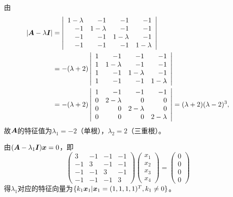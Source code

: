 \begin{frame}\ft{\subsecname}
\begin{jie}
  由
  $$
  \begin{aligned}
  |\boldsymbol{A}-\lambda\boldsymbol{I}|&=
  \left|
    \begin{array}{rrrr}
      1-\lambda&-1&-1&-1\\
      -1&1-\lambda&-1&-1\\
      -1&-1&1-\lambda&-1\\
      -1&-1&-1&1-\lambda
    \end{array}
  \right|\\
  &=-(\lambda+2)
  \left|
    \begin{array}{rrrr}
      1&-1&-1&-1\\
      1&1-\lambda&-1&-1\\
      1&-1&1-\lambda&-1\\
      1&-1&-1&1-\lambda
    \end{array}
  \right|\\
  &=-(\lambda+2)
  \left|
    \begin{array}{rrrr}
      1&-1&-1&-1\\
      0&2-\lambda&0&0\\
      0&0&2-\lambda&0\\
      0&0&0&2-\lambda
    \end{array}
  \right|=(\lambda+2)(\lambda-2)^3,
  \end{aligned}
  $$
  故$\boldsymbol{A}$的特征值为$\lambda_1=-2$（单根），$\lambda_2=2$（三重根）。

  由$(\boldsymbol{A}-\lambda_1\boldsymbol{I}){\boldsymbol{x}}=0$，即
  $$
  \left(
    \begin{array}{rrrr}
      3&-1&-1&-1\\
      -1&3&-1&-1\\
      -1&-1&3&-1\\
      -1&-1&-1&3
    \end{array}
  \right)
  \left(
    \begin{array}{c}
      x_1\\x_2\\x_3\\x_4
    \end{array}
  \right)=
  \left(
    \begin{array}{c}
      0\\0\\0\\0
    \end{array}
  \right)
  $$
  得$\lambda_1$对应的特征向量为$\{k_1{\boldsymbol{x}}_1|{\boldsymbol{x}}_1=(1,1,1,1)^T, k_1\ne 0\}$。


\end{jie}
\end{frame}
